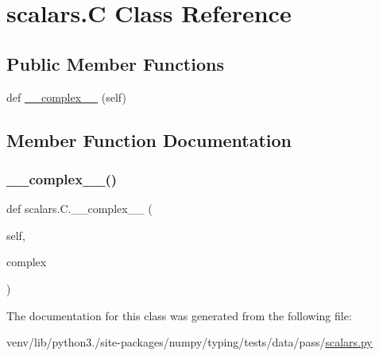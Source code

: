 \hypertarget{classscalars_1_1C}{}\section{scalars.\+C Class Reference}
\label{classscalars_1_1C}
\subsection*{Public Member Functions}
\begin{DoxyCompactItemize}
\item 
def \hyperlink{classscalars_1_1C_a3c12bdd2d7ca0cf3ed90065e0c82ff0f}{\+\_\+\+\_\+complex\+\_\+\+\_\+} (self)
\end{DoxyCompactItemize}


\subsection{Member Function Documentation}
\mbox{\label{classscalars_1_1C_a3c12bdd2d7ca0cf3ed90065e0c82ff0f}} 
\subsubsection{\texorpdfstring{\+\_\+\+\_\+complex\+\_\+\+\_\+()}{\_\_complex\_\_()}}
{\footnotesize\ttfamily def scalars.\+C.\+\_\+\+\_\+complex\+\_\+\+\_\+ (\begin{DoxyParamCaption}\item[{}]{self,  }\item[{}]{complex }\end{DoxyParamCaption})}



The documentation for this class was generated from the following file\+:\begin{DoxyCompactItemize}
\item 
venv/lib/python3./site-\/packages/numpy/typing/tests/data/pass/\hyperlink{pass_2scalars_8py}{scalars.\+py}\end{DoxyCompactItemize}
